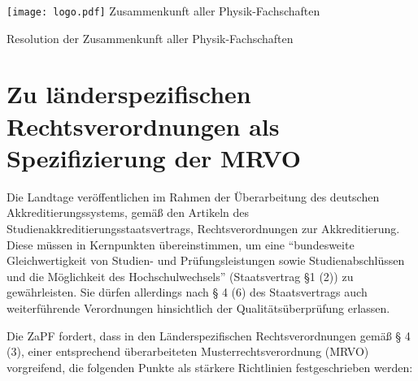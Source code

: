 \documentclass[DIV=calc]{scrartcl}
\begin{document}
    \hspace{0.87\textwidth}
    \begin{minipage}{120pt}
        \vspace{-2cm}
        \texttt{[image: logo.pdf]}
        \centering
        \small Zusammenkunft aller Physik-Fachschaften
    \end{minipage}
    \begin{center}
        \huge{Resolution der Zusammenkunft aller Physik-Fachschaften}\vspace{.25\baselineskip}\\
        \normalsize
    \end{center}
    \vspace{0cm} 
\section*{Zu länderspezifischen Rechtsverordnungen als Spezifizierung der MRVO}
Die Landtage veröffentlichen im Rahmen der Überarbeitung des deutschen Akkreditierungssystems, gemäß den Artikeln des Studienakkreditierungsstaatsvertrags, Rechtsverordnungen zur Akkreditierung.\\ 
Diese müssen in Kernpunkten übereinstimmen, um eine "`bundesweite Gleichwertigkeit von Studien- und Prüfungsleistungen sowie Studienabschlüssen und die Möglichkeit des Hochschulwechsels"' (Staatsvertrag §1 (2)) zu gewährleisten. Sie dürfen allerdings nach § 4 (6) des Staatsvertrags auch weiterführende Verordnungen hinsichtlich der Qualitätsüberprüfung erlassen.

Die ZaPF fordert, dass in den Länderspezifischen Rechtsverordnungen gemäß § 4 (3), einer entsprechend überarbeiteten Musterrechtsverordnung (MRVO) vorgreifend, die folgenden Punkte als stärkere Richtlinien festgeschrieben werden:
\end{document}
